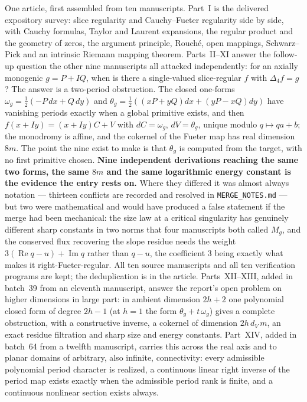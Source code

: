 \documentclass[11pt]{article}
\begin{document}
{One article, first assembled from ten manuscripts.  Part~I is the delivered
expository survey: slice regularity and Cauchy--Fueter regularity side by side,
with Cauchy formulas, Taylor and Laurent expansions, the regular product and
the geometry of zeros, the argument principle, Rouch\'e, open mappings,
Schwarz--Pick and an intrinsic Riemann mapping theorem.  Parts~II--XI answer
the follow-up question the other nine manuscripts all attacked independently:
for an axially monogenic $g=P+IQ$, when is there a single-valued slice-regular
$f$ with $\Delta_4 f=g$?  The answer is a two-period obstruction.  The closed
one-forms $\omega_g=\tfrac12(-P\,dx+Q\,dy)$ and
$\theta_g=\tfrac12((xP+yQ)dx+(yP-xQ)dy)$ have vanishing periods exactly when a
global primitive exists, and then $f(x+Iy)=(x+Iy)C+V$ with $dC=\omega_g$,
$dV=\theta_g$, unique modulo $q\mapsto qa+b$; the monodromy is affine, and the
cokernel of the Fueter map has real dimension $8m$.  The point the nine exist
to make is that $\theta_g$ is computed from the target, with no first primitive
chosen.  \textbf{Nine independent derivations reaching the same two forms, the
same $8m$ and the same logarithmic energy constant is the evidence the entry
rests on.}  Where they differed it was almost always notation --- thirteen
conflicts are recorded and resolved in \nolinkurl{MERGE_NOTES.md} --- but two
were mathematical and would have produced a false statement if the merge had
been mechanical: the size law at a critical singularity has genuinely different
sharp constants in two norms that four manuscripts both called $M_g$, and the
conserved flux recovering the slope residue needs the weight
$3(\operatorname{Re}q-u)+\operatorname{Im}q$ rather than $q-u$, the coefficient $3$ being exactly what
makes it right-Fueter-regular.  All ten source manuscripts and all ten
verification programs are kept; the deduplication is in the article.
Parts~XII--XIII, added in batch~39 from an eleventh manuscript, answer the
report's open problem on higher dimensions in large part: in ambient dimension
$2h+2$ one polynomial closed form of degree $2h-1$ (at $h=1$ the form
$\theta_g+t\,\omega_g$) gives a complete obstruction, with a constructive
inverse, a cokernel of dimension $2h\,d_V\,m$, an exact residue filtration and
sharp size and energy constants.  Part~XIV, added in batch~64 from a twelfth
manuscript, carries this across the real axis and to planar domains of
arbitrary, also infinite, connectivity: every admissible polynomial period
character is realized, a continuous linear right inverse of the period map
exists exactly when the admissible period rank is finite, and a continuous
nonlinear section exists always.}
\end{document}
